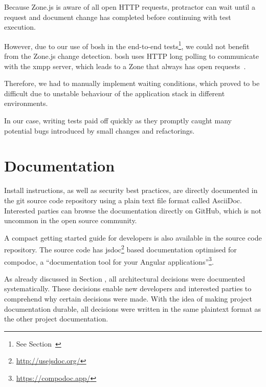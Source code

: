 Because Zone.js is aware of all open HTTP requests, protractor can wait until a request and document change has completed before continuing with test execution.

However, due to our use of \gls{bosh} in the end-to-end tests\footnote{See Section~}, we could not benefit from the Zone.js change detection.
\gls{bosh} uses HTTP long polling to communicate with the \gls{xmpp} server, which leads to a Zone that always has open requests~\cite{xep-0124}.

Therefore, we had to manually implement waiting conditions, which proved to be difficult due to unstable behaviour of the application stack in different environments.

In our case, writing tests paid off quickly as they promptly caught many potential bugs introduced by small changes and refactorings.

\section{Documentation}

Install instructions, as well as security best practices, are directly documented in the git source code repository using a plain text file format called AsciiDoc.
Interested parties can browse the documentation directly on GitHub, which is not uncommon in the open source community.

A compact getting started guide for developers is also available in the source code repository.
The source code has jsdoc\footnote{\url{http://usejsdoc.org/}} based documentation optimised for compodoc, a ``documentation tool for your Angular applications''\footnote{\url{https://compodoc.app/}}.

As already discussed in Section , all architectural decisions were documented systematically.
These decisions enable new developers and interested parties to comprehend why certain decisions were made.
With the idea of making project documentation durable, all decisions were written in the same plaintext format as the other project documentation.
